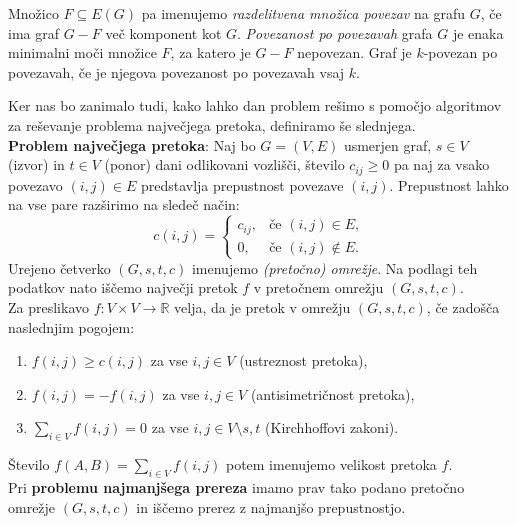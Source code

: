 \documentclass[a4paper,12pt]{article}
\theoremstyle{definition}
\begin{document}
Množico $F \subseteq E(G)$ pa imenujemo \textit{razdelitvena množica 
povezav} na grafu $G$, če ima graf $G - F$ več komponent kot $G$.
\textit{Povezanost po povezavah} grafa $G$ je enaka minimalni moči
množice $F$, za katero je $G - F$ nepovezan. Graf je $k$-povezan po
povezavah, če je njegova povezanost po povezavah vsaj $k$. \newline


Ker nas bo zanimalo tudi, kako lahko dan problem rešimo s pomočjo
algoritmov za reševanje problema največjega pretoka, definiramo še 
slednjega. \\


\textbf{Problem največjega pretoka}: Naj bo $G = (V, E)$ usmerjen graf,
$s \in V$ (izvor) in $t \in V$ (ponor) dani odlikovani vozlišči,
število $c_{ij} \geq 0$ pa naj za vsako povezavo $(i, j) \in E$ 
predstavlja prepustnost povezave $(i, j)$.
Prepustnost lahko na vse pare razširimo na sledeč način:
\begin{displaymath}
	c(i,j) = \left\{
		\begin{array}{ll}
			c_{ij}, &\text{če } (i,j) \in E, \\
			0, &\text{če } (i, j) \notin E.
		\end{array}\right.
\end{displaymath}
Urejeno četverko $(G, s, t, c)$ imenujemo \textit{(pretočno) omrežje}.
Na podlagi teh podatkov nato iščemo največji pretok $f$ v 
pretočnem omrežju $(G, s, t, c).$ \\

Za preslikavo $f: V \times V \to \mathbb{R}$ velja, da je pretok v omrežju $(G,s,t,c)$, 
če zadošča naslednjim pogojem:\\
\begin{enumerate}
	\item $f(i,j) \geq c(i,j)$ za vse $i, j \in V$ (ustreznost pretoka),
	\item $f(i,j) = - f(i,j)$ za vse $i,j \in V$ (antisimetričnost pretoka),
	\item $\sum_{i \in V} f(i,j) = 0 $ za vse $i, j \in V \setminus {s,t}$ (Kirchhoffovi zakoni).\\
\end{enumerate}
Število $f(A,B) = \sum_{i \in V} f(i,j)$ potem imenujemo velikost pretoka $f$.\\


Pri \textbf{problemu najmanjšega prereza} imamo prav tako podano
pretočno omrežje $(G, s, t, c)$ in iščemo prerez z najmanjšo prepustnostjo.
\end{document}
